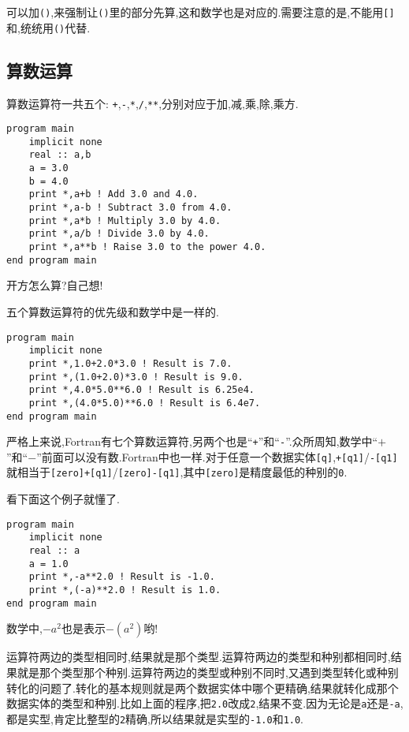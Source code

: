可以加\texttt{()},来强制让\texttt{()}里的部分先算,这和数学也是对应的.需要注意的是,不能用\texttt{[]}和\texttt{{}},统统用\texttt{()}代替.

\subsection{算数运算}\label{fortran_numeric_operator}

算数运算符一共五个: \texttt{+},\texttt{-},\texttt{*},\texttt{/},\texttt{**},分别对应于加,减,乘,除,乘方.
\begin{lstlisting}
program main
    implicit none
    real :: a,b
    a = 3.0
    b = 4.0
    print *,a+b ! Add 3.0 and 4.0.
    print *,a-b ! Subtract 3.0 from 4.0.
    print *,a*b ! Multiply 3.0 by 4.0.
    print *,a/b ! Divide 3.0 by 4.0.
    print *,a**b ! Raise 3.0 to the power 4.0.
end program main
\end{lstlisting}

开方怎么算?自己想!

五个算数运算符的优先级和数学中是一样的.
\begin{lstlisting}
program main
    implicit none
    print *,1.0+2.0*3.0 ! Result is 7.0.
    print *,(1.0+2.0)*3.0 ! Result is 9.0.
    print *,4.0*5.0**6.0 ! Result is 6.25e4.
    print *,(4.0*5.0)**6.0 ! Result is 6.4e7.
end program main
\end{lstlisting}

严格上来说,Fortran有七个算数运算符,另两个也是``\texttt{+}''和``\texttt{-}''.众所周知,数学中``$+$''和``$-$''前面可以没有数.Fortran中也一样.对于任意一个数据实体\texttt{[q]},\texttt{+[q1]}/\texttt{-[q1]}就相当于\texttt{[zero]+[q1]}/\texttt{[zero]-[q1]},其中\texttt{[zero]}是精度最低的种别的\texttt{0}.

看下面这个例子就懂了.
\begin{lstlisting}
program main
    implicit none
    real :: a
    a = 1.0
    print *,-a**2.0 ! Result is -1.0.
    print *,(-a)**2.0 ! Result is 1.0.
end program main
\end{lstlisting}

数学中,$-a^2$也是表示$-(a^2)$哟!

运算符两边的类型相同时,结果就是那个类型.运算符两边的类型和种别都相同时,结果就是那个类型那个种别.运算符两边的类型或种别不同时,又遇到类型转化或种别转化的问题了.转化的基本规则就是两个数据实体中哪个更精确,结果就转化成那个数据实体的类型和种别.比如上面的程序,把\texttt{2.0}改成\texttt{2},结果不变.因为无论是\texttt{a}还是\texttt{-a},都是实型,肯定比整型的\texttt{2}精确,所以结果就是实型的\texttt{-1.0}和\texttt{1.0}.

